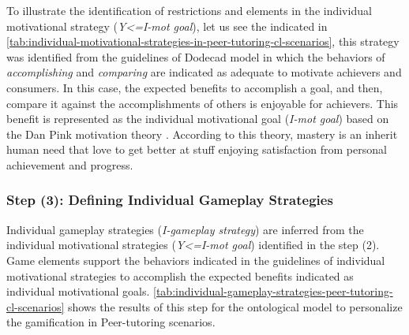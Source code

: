 To illustrate the identification of restrictions and elements in the individual motivational strategy (\emph{Y<=I-mot goal}), let us see the  indicated in \autoref{tab:individual-motivational-strategies-in-peer-tutoring-cl-scenarios}, this strategy was identified from the guidelines of Dodecad model in which the behaviors of \emph{accomplishing} and \emph{comparing} are indicated as adequate to motivate achievers and consumers.
In this case, the expected benefits to accomplish a goal, and then, compare it against the accomplishments of others is enjoyable for achievers.
This benefit is represented as the individual motivational goal  (\emph{I-mot goal}) based on the Dan Pink motivation theory \cite{Pink2011}.
According to this theory, mastery is an inherit human need that love to get better at stuff enjoying satisfaction from personal achievement and progress.

\subsubsection*{Step (3): Defining Individual Gameplay Strategies}

Individual gameplay strategies (\emph{I-gameplay strategy}) are inferred from the individual motivational strategies (\emph{Y<=I-mot goal}) identified in the step (2).
Game elements support the behaviors indicated in the guidelines of individual motivational strategies to accomplish the expected benefits indicated as individual motivational goals.
\autoref{tab:individual-gameplay-strategies-peer-tutoring-cl-scenarios} shows the results of this step for the ontological model to personalize the gamification in Peer-tutoring scenarios.

